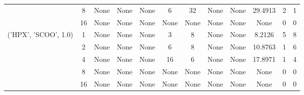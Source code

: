\begin{tabular}{cccccccccccc}
& 8& None& None& None& 6& 32& None& None& 29.4913& 2& 1\\
& 16& None& None& None& None& None& None& None& None& 0& 0\\
\hline
\multirow{5}{*}{('HPX', 'SCOO', 1.0)}& 1& None& None& None& 3& 8& None& None& 8.2126& 5& 8\\
& 2& None& None& None& 6& 8& None& None& 10.8763& 1& 6\\
& 4& None& None& None& 16& 6& None& None& 17.8971& 1& 4\\
& 8& None& None& None& None& None& None& None& None& 0& 0\\
& 16& None& None& None& None& None& None& None& None& 0& 0\\
\hline
\end{tabular}
